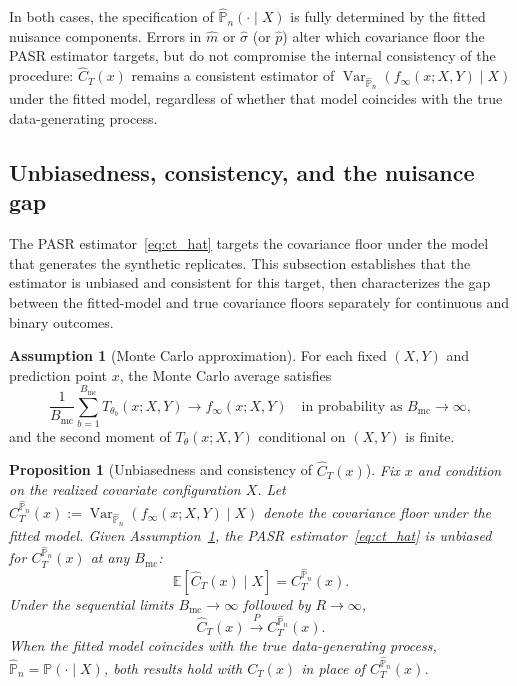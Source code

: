 \documentclass[11pt]{article}
\theoremstyle{plain}
\newtheorem{proposition}{Proposition}
\theoremstyle{definition}
\newtheorem{assumption}{Assumption}
\theoremstyle{remark}
\DeclareMathOperator{\Var}{Var}
\begin{document}
\medskip
In both cases, the specification of $\widehat{\mathbb P}_n(\cdot\mid X)$ is fully determined by the fitted nuisance components. Errors in $\hat m$ or $\hat\sigma$ (or $\hat p$) alter which covariance floor the PASR estimator targets, but do not compromise the internal consistency of the procedure: $\widehat C_T(x)$ remains a consistent estimator of $\Var_{\widehat{\mathbb P}_n}\!\left(f_\infty(x;X,Y)\mid X\right)$ under the fitted model, regardless of whether that model coincides with the true data-generating process.

\subsection{Unbiasedness, consistency, and the nuisance gap}
\label{subsec:ct_consistency}

The PASR estimator~\eqref{eq:ct_hat} targets the covariance floor under the model that generates the synthetic replicates. This subsection establishes that the estimator is unbiased and consistent for this target, then characterizes the gap between the fitted-model and true covariance floors separately for continuous and binary outcomes.

\begin{assumption}[Monte Carlo approximation]
	\label{ass:mc}
	For each fixed $(X,Y)$ and prediction point $x$, the Monte Carlo average satisfies
	\[
	\frac{1}{B_{\mathrm{mc}}}\sum_{b=1}^{B_{\mathrm{mc}}} T_{\theta_{b}}(x;X,Y)\longrightarrow f_\infty(x;X,Y) \quad\text{in probability as }B_{\mathrm{mc}}\to\infty,
	\]
	and the second moment of $T_\theta(x;X,Y)$ conditional on $(X,Y)$ is finite.
\end{assumption}

\begin{proposition}[Unbiasedness and consistency of $\widehat C_T(x)$]
	\label{prop:ct_consistency}
	Fix $x$ and condition on the realized covariate configuration $X$. Let $C_T^{\widehat{\mathbb P}_n}(x) := \Var_{\widehat{\mathbb P}_n}(f_\infty(x;X,Y) \mid X)$ denote the covariance floor under the fitted model. Given Assumption~\ref{ass:mc}, the PASR estimator~\eqref{eq:ct_hat} is unbiased for $C_T^{\widehat{\mathbb P}_n}(x)$ at any $B_{\mathrm{mc}}$:
	\[
	\mathbb E\!\left[\widehat C_T(x) \mid X\right] = C_T^{\widehat{\mathbb P}_n}(x).
	\]
	Under the sequential limits $B_{\mathrm{mc}} \to \infty$ followed by $R \to \infty$,
	\[
	\widehat C_T(x) \xrightarrow{P} C_T^{\widehat{\mathbb P}_n}(x).
	\]
	When the fitted model coincides with the true data-generating process, $\widehat{\mathbb P}_n = \mathbb P(\cdot \mid X)$, both results hold with $C_T(x)$ in place of $C_T^{\widehat{\mathbb P}_n}(x)$.
\end{proposition}
\end{document}
